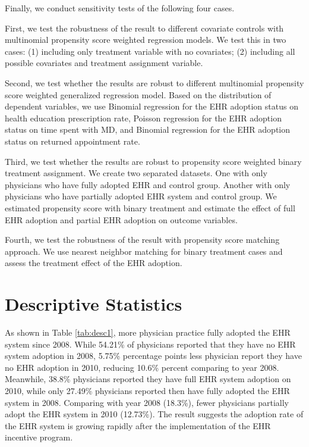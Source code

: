 \documentclass[12pt]{report}
\begin{document}
Finally, we conduct sensitivity tests of the following four cases.

First, we test the robustness of the result to different covariate controls with multinomial propensity score weighted regression models. We test this in two cases: (1) including only treatment variable with no covariates; (2) including all possible covariates and treatment assignment variable.

Second, we test whether the results are robust to different multinomial propensity score weighted generalized regression model. Based on the distribution of dependent variables, we use Binomial regression for the EHR adoption status on health education prescription rate, Poisson regression for the EHR adoption status on time spent with MD, and Binomial regression for the EHR adoption status on returned appointment rate.

Third, we test whether the results are robust to propensity score weighted binary treatment assignment. We create two separated datasets. One with only physicians who have fully adopted EHR and control group. Another with only physicians who have partially adopted EHR system and control group. We estimated propensity score with binary treatment and estimate the effect of full EHR adoption and partial EHR adoption on outcome variables.

Fourth, we test the robustness of the result with propensity score matching approach. We use nearest neighbor matching for binary treatment cases and assess the treatment effect of the EHR adoption.


\chapter{Descriptive Statistics}

As shown in Table \ref{tab:desc1}, more physician practice fully adopted the EHR system since 2008. While 54.21\% of physicians reported that they have no EHR system adoption in 2008, 5.75\% percentage points less physician report they have no EHR adoption in 2010, reducing 10.6\% percent comparing to year 2008. Meanwhile, 38.8\% physicians reported they have full EHR system adoption on 2010, while only 27.49\% physicians reported then have fully adopted the EHR system in 2008. Comparing with year 2008 (18.3\%), fewer physicians partially adopt the EHR system in 2010 (12.73\%). The result suggests the adoption rate of the EHR system is growing rapidly after the implementation of the EHR incentive program.
\end{document}
